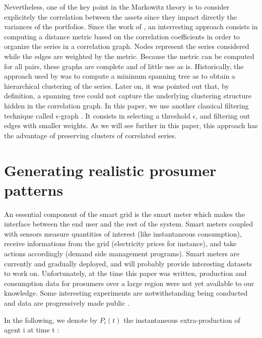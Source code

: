 \documentclass[conference]{IEEEtran}
\begin{document}
Nevertheless, one of the key point in the Markowitz theory is to consider explicitely the correlation between the assets since they impact directly the variances of the portfolios. Since the work of \cite{Mantegna1999}, an interresting approach consists in computing a distance metric based on the correlation coefficients in order to organize the series in a correlation graph. Nodes represent the series considered while the edges are weighted by the metric. Because the metric can be computed for all pairs, these graphs are complete and of little use as is. Historically, the approach used by \cite{Mantegna1999} was to compute a minimum spanning tree as to obtain a hierarchical clustering of the series. Later on, it was pointed out that, by definition, a spanning tree could not capture the underlying clustering structure hidden in the correlation graph. In this paper, we use another classical filtering technique called $ \epsilon $-graph \cite{Garas2008}. It consists in selecting a threshold $ \epsilon $, and filtering out edges with smaller weights. As we will see further in this paper, this approach has the advantage of preserving clusters of correlated series.


%
%

\section{Generating realistic prosumer patterns}
\label{sec:data}

An essential component of the smart grid is the smart meter which makes the interface between the end user and the rest of the system. Smart meters coupled with sensors measure quantities of interest (like instantaneous consumption), receive informations from the grid (electricity prices for instance), and take actions accordingly (demand side management programs). Smart meters are currently and gradually deployed, and will probably provide interesting datasets to work on. Unfortunately, at the time this paper was written, production and consumption data for prosumers over a large region were not yet available to our knowledge. Some interesting experiments are notwithstanding being conducted and data are progressively made public \cite{ISSDA}. 

In the following, we denote by $ P_{i}(t) $ the instantaneous extra-production of agent i at time t :
\end{document}

